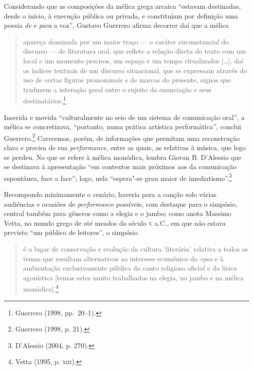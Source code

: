 Considerando que as composições da mélica grega arcaica “estavam destinadas,
desde o início, à execução pública ou privada, e constituíam por definição uma
poesia \textit{de} e \textit{para} a voz”, Gustavo Guerrero
afirma decorrer daí que a mélica

\begin{quote}
apareça dominada por um maior traço --- o caráter circunstancial do discurso --- de
literatura oral, que reflete a relação direta do texto com um local e um
momento precisos, um espaço e um tempo ritualizados [\ldots{}]; daí os índices
textuais de um discurso situacional, que se expressam através do uso de certas
figuras pronominais e de marcas do presente, signos que traduzem a interação
geral entre o sujeito da enunciação e seus destinatários.\footnote{ Guerrero (1998, pp.~20--1).}
\end{quote}

Inserida e movida “culturalmente no seio de um sistema de comunicação oral”, a
mélica se concretizava, “portanto, numa prática artística performática”,
conclui Guerrero.\footnote{ Guerrero (1998, p. 21).} Carecemos, porém, de informações que permitam uma
reconstrução clara e precisa de sua \textit{performance}, entre as quais, as
relativas à música, que logo se perdeu. No que se refere à mélica monódica,
lembra Giovan B. D’Alessio que se destinava à apresentação “em
contextos mais próximos aos da comunicação espontânea, face a face”; logo, nela
“espera"-se grau maior de imediatismo”.\footnote{ D’Alessio (2004, p. 270).} 

Recompondo minimamente o cenário, haveria para a canção solo várias audiências e
ocasiões de \textit{performance} possíveis, com destaque para o simpósio,
central também para gêneros como a elegia e o jambo; como anota Massimo Vetta,
no mundo grego de até meados do século \textsc{v} a.C., em que não
estava previsto “um público de leitores”, o simpósio 

\begin{quote}
é o lugar de conservação
e evolução da cultura ‘literária’ relativa a todos os temas que resultam
alternativos ao interesse ecumênico do \textit{epos} e à ambientação
exclusivamente pública do canto religioso oficial e da lírica agonística
[temas estes muito trabalhados na elegia, no jambo e na mélica monódica].\footnote{ Vetta (1995, p. \textsc{xiii}).}
\end{quote}

